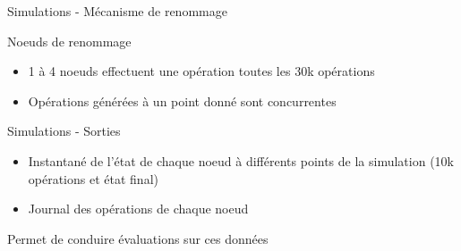 \begin{frame}{Simulations - Mécanisme de renommage}
  \begin{block}{Noeuds de renommage}
    \begin{itemize}
      \item 1 à 4 noeuds effectuent une \alert{opération \ren toutes les 30k opérations}
      \item Opérations \ren générées à un point donné sont \alert{concurrentes}
    \end{itemize}
  \end{block}
\end{frame}

\begin{frame}{Simulations - Sorties}
  \begin{itemize}
    \item \alert{Instantané de l'état} de chaque noeud à différents points de la simulation (10k opérations et état final)
    \item \alert{Journal des opérations} de chaque noeud
  \end{itemize}
  \pause
  \begin{center}
    \alert{Permet de conduire évaluations sur ces données}
  \end{center}
\end{frame}
